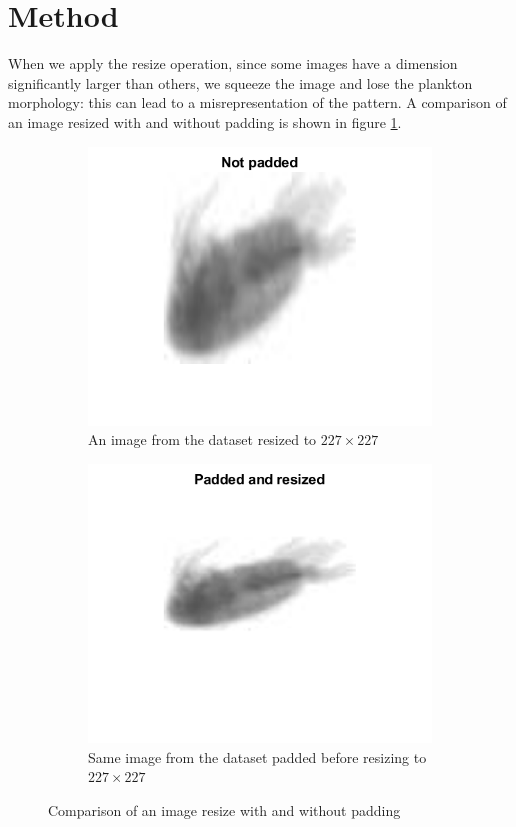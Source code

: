 \documentclass[letterpaper]{article} %
\begin{document}
\section{Method} \label{sec:method}
When we apply the resize operation, since some images have a dimension significantly larger than others, we squeeze the image and lose the plankton morphology: this can lead to a misrepresentation of the pattern.
A comparison of an image resized with and without padding is shown in figure \ref{fig:comparisonPaddingOrNot}.
\begin{figure}[h]
    \centering
    \begin{subfigure}{0.45\textwidth}
        \includegraphics[width=\textwidth]{EX2_only_resized_41_84.png}
        \caption{An image from the dataset resized to $227 \times 227$}
    \end{subfigure}
    \begin{subfigure}{0.45\textwidth}
        \includegraphics[width=\textwidth]{EX2_padded_and_resized_41_84.png}
        \caption{Same image from the dataset padded before resizing to $227 \times 227$}
    \end{subfigure}
    \caption{Comparison of an image resize with and without padding}
    \label{fig:comparisonPaddingOrNot}
\end{figure}
\end{document}
